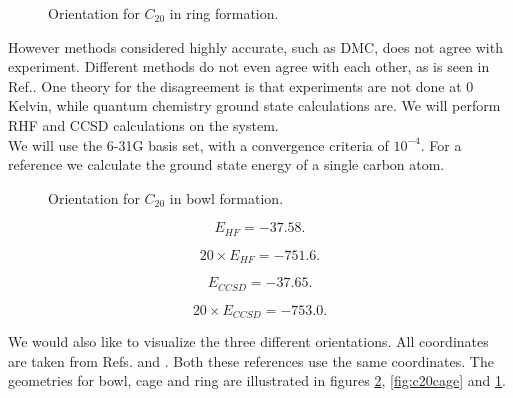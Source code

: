 \begin{figure}[h!]
\begin{center}
\caption{Orientation for $C_{20}$ in ring formation.}
\label{fig:c20ring}
\end{center}
\end{figure}

However methods considered highly accurate, such as DMC, does not agree with experiment. Different methods do not even agree with each other, as is seen in Ref.\cite{c20coordinatesarticlezz}. One theory for the disagreement is that experiments are not done at 0 Kelvin, while quantum chemistry ground state calculations are. We will perform RHF and CCSD calculations on the system. \\

We will use the 6-31G basis set, with a convergence criteria of $10^{-4}$. For a reference we calculate the ground state energy of a single carbon atom.

\begin{figure}[h!]
\begin{center}
\caption{Orientation for $C_{20}$ in bowl formation.}
\label{fig:c20bowl}
\end{center}
\end{figure}

\begin{equation}
E_{HF} = -37.58 .
\end{equation}

\begin{equation}
20 \times E_{HF} = -751.6 .
\end{equation}

\begin{equation}
E_{CCSD} = -37.65 .
\end{equation}

\begin{equation}
20 \times E_{CCSD} = -753.0 .
\end{equation}

We would also like to visualize the three different orientations. All coordinates are taken from Refs.\cite{c20coordinatesarticlezz} and \cite{c20coordinatesarticlezz10}. Both these references use the same coordinates. The geometries for bowl, cage and ring are illustrated in figures \ref{fig:c20bowl}, \ref{fig:c20cage} and \ref{fig:c20ring}.\\




